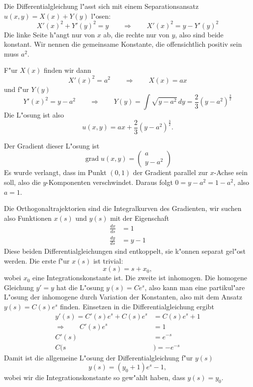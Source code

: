 \begin{loesung}
Die Differentialgleichung  l"asst sich mit einem Separationsansatz
$u(x,y)=X(x)+Y(y)$
l"osen:
\[
X'(x)^2+Y'(y)^2=y
\qquad
\Rightarrow
\qquad
X'(x)^2=y-Y'(y)^2
\]
Die linke Seite h"angt nur von $x$ ab, die rechte nur von $y$, also
sind beide konstant.
Wir nennen die gemeinsame Konstante, die offensichtlich positiv sein
muss $a^2$.

F"ur $X(x)$ finden wir dann
\[
X'(x)^2=a^2
\qquad\Rightarrow\qquad
X(x)=ax
\]
und f"ur $Y(y)$
\[
Y'(x)^2=y-a^2
\qquad\Rightarrow\qquad
Y(y)=\int \sqrt{y-a^2}\,dy=\frac23(y-a^2)^{\frac32}
\]
Die L"osung ist also
\[
u(x,y)=ax + \frac23(y-a^2)^{\frac32}.
\]

Der Gradient dieser L"osung ist
\[
\operatorname{grad}u(x,y)=\begin{pmatrix}a\\y-a^2\end{pmatrix}
\]
Es wurde verlangt, dass im Punkt $(0,1)$ der Gradient parallel zur
$x$-Achse sein soll, also die $y$-Komponenten verschwindet. Daraus
folgt $0=y-a^2=1-a^2$, also $a=1$.

Die Orthogonaltrajektorien sind die Integralkurven des Gradienten,
wir suchen also Funktionen $x(s)$ und $y(s)$ mit der Eigenschaft
\begin{align*}
\frac{dx}{ds}&=1\\
\frac{dy}{ds}&=y-1
\end{align*}
Diese beiden Differentialgleichungen sind entkoppelt, sie k"onnen
separat gel"ost werden. Die erste f"ur $x(s)$ ist trivial:
\[
x(s)=s + x_0,
\]
wobei $x_0$ eine Integrationskonstante ist.
Die zweite ist inhomogen. Die homogene Gleichung $y'=y$ hat die
L"osung $y(s)=Ce^s$, also kann man eine partikul"are L"osung
der inhomogene durch Variation
der Konstanten, also mit dem Ansatz $y(s)=C(s)e^s$ finden.
Einsetzen in die Differentialgleichung ergibt
\begin{align*}
y'(s)=C'(s)e^s+C(s)e^s&=C(s)e^s+1
\\
\Rightarrow\qquad
C'(s)e^s&=1\\
C'(s)&=e^{-s}\\
C(s&)=-e^{-s}
\end{align*}
Damit ist die allgemeine L"osung der Differentialgleichung f"ur $y(s)$
\[
y(s)=(y_0+1)e^s-1,
\]
wobei wir die Integrationskonstante so gew"ahlt haben, dass $y(s)=y_0$.


\end{loesung}
